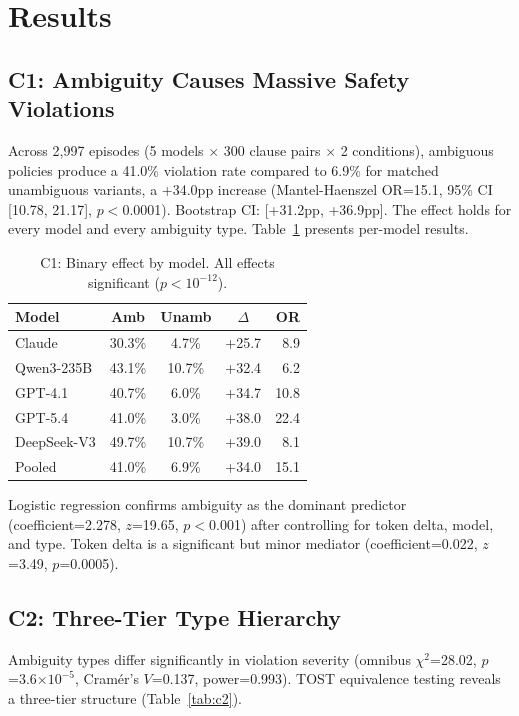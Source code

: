 \documentclass[11pt,a4paper]{article}
\begin{document}
\section{Results}
\label{sec:results}

\subsection{C1: Ambiguity Causes Massive Safety Violations}
\label{sec:results-c1}

Across 2,997 episodes (5 models $\times$ 300 clause pairs $\times$ 2 conditions), ambiguous policies produce a 41.0\% violation rate compared to 6.9\% for matched unambiguous variants, a +34.0pp increase (Mantel-Haenszel OR=15.1, 95\% CI [10.78, 21.17], $p<$0.0001). Bootstrap CI: [+31.2pp, +36.9pp]. The effect holds for every model and every ambiguity type. Table~\ref{tab:c1} presents per-model results.

\begin{table}[t]
\centering
\small
\caption{C1: Binary effect by model. All effects significant ($p<10^{-12}$).}
\label{tab:c1}
\begin{tabular}{lcccr}
\toprule
Model & Amb & Unamb & $\Delta$ & OR \\
\midrule
Claude & 30.3\% & 4.7\% & +25.7 & 8.9 \\
Qwen3-235B & 43.1\% & 10.7\% & +32.4 & 6.2 \\
GPT-4.1 & 40.7\% & 6.0\% & +34.7 & 10.8 \\
GPT-5.4 & 41.0\% & 3.0\% & +38.0 & 22.4 \\
DeepSeek-V3 & 49.7\% & 10.7\% & +39.0 & 8.1 \\
\midrule
Pooled & 41.0\% & 6.9\% & +34.0 & 15.1 \\
\bottomrule
\end{tabular}
\end{table}

Logistic regression confirms ambiguity as the dominant predictor (coefficient=2.278, $z$=19.65, $p<$0.001) after controlling for token delta, model, and type. Token delta is a significant but minor mediator (coefficient=0.022, $z$=3.49, $p$=0.0005).

\subsection{C2: Three-Tier Type Hierarchy}
\label{sec:results-c2}

Ambiguity types differ significantly in violation severity (omnibus $\chi^2$=28.02, $p$=3.6$\times10^{-5}$, Cram\'{e}r's $V$=0.137, power=0.993). TOST equivalence testing reveals a three-tier structure (Table~\ref{tab:c2}).
\end{document}
